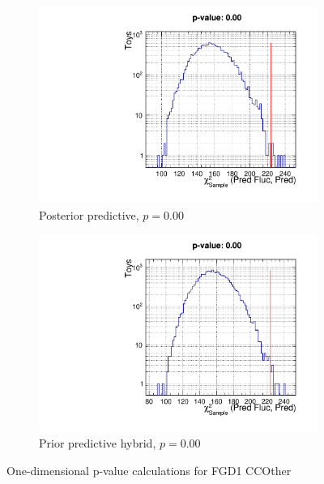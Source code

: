 \begin{figure}[h]
	\begin{subfigure}[t]{0.49\textwidth}
		\includegraphics[width=\textwidth, trim={0mm 0mm 0mm 14mm}, clip,page=1]{figures/mach3/data/postpred/pvalue_posteriorpred_fgd1ccother_1d}
		\caption{Posterior predictive, $p=0.00$}
	\end{subfigure}
	\begin{subfigure}[t]{0.49\textwidth}
		\includegraphics[width=\textwidth, trim={0mm 0mm 0mm 14mm}, clip,page=1]{figures/mach3/data/postpred/prior_pred_fgd1ccother}
		\caption{Prior predictive hybrid, $p=0.00$}
	\end{subfigure}
	\caption{One-dimensional p-value calculations for FGD1 CCOther}
	\label{fig:posterior_pred_data_1d_ccother}
\end{figure}

